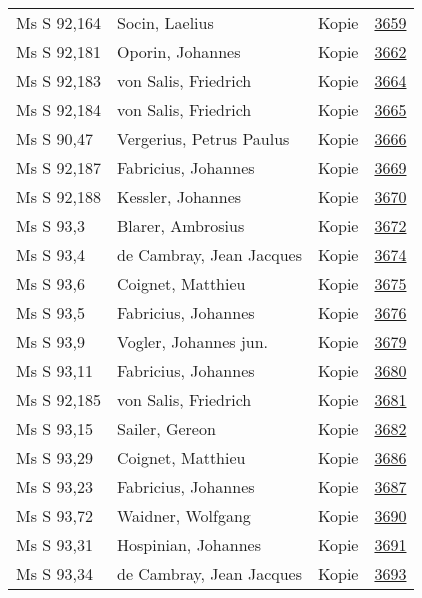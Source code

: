 \documentclass[10pt,a4paper,landscape]{report}
\begin{document}
\begin{longtable}{p{16cm}p{4cm}lr}
Ms S 92,164	&	Socin, Laelius	&	Kopie	&	\href{http://130.60.24.72/assignment/3659}{3659}\\
Ms S 92,181	&	Oporin, Johannes	&	Kopie	&	\href{http://130.60.24.72/assignment/3662}{3662}\\
Ms S 92,183	&	von Salis, Friedrich	&	Kopie	&	\href{http://130.60.24.72/assignment/3664}{3664}\\
Ms S 92,184	&	von Salis, Friedrich	&	Kopie	&	\href{http://130.60.24.72/assignment/3665}{3665}\\
Ms S 90,47	&	Vergerius, Petrus Paulus	&	Kopie	&	\href{http://130.60.24.72/assignment/3666}{3666}\\
Ms S 92,187	&	Fabricius, Johannes	&	Kopie	&	\href{http://130.60.24.72/assignment/3669}{3669}\\
Ms S 92,188	&	Kessler, Johannes	&	Kopie	&	\href{http://130.60.24.72/assignment/3670}{3670}\\
Ms S 93,3	&	Blarer, Ambrosius	&	Kopie	&	\href{http://130.60.24.72/assignment/3672}{3672}\\
Ms S 93,4	&	de Cambray, Jean Jacques	&	Kopie	&	\href{http://130.60.24.72/assignment/3674}{3674}\\
Ms S 93,6	&	Coignet, Matthieu	&	Kopie	&	\href{http://130.60.24.72/assignment/3675}{3675}\\
Ms S 93,5	&	Fabricius, Johannes	&	Kopie	&	\href{http://130.60.24.72/assignment/3676}{3676}\\
Ms S 93,9	&	Vogler, Johannes jun.	&	Kopie	&	\href{http://130.60.24.72/assignment/3679}{3679}\\
Ms S 93,11	&	Fabricius, Johannes	&	Kopie	&	\href{http://130.60.24.72/assignment/3680}{3680}\\
Ms S 92,185	&	von Salis, Friedrich	&	Kopie	&	\href{http://130.60.24.72/assignment/3681}{3681}\\
Ms S 93,15	&	Sailer, Gereon	&	Kopie	&	\href{http://130.60.24.72/assignment/3682}{3682}\\
Ms S 93,29	&	Coignet, Matthieu	&	Kopie	&	\href{http://130.60.24.72/assignment/3686}{3686}\\
Ms S 93,23	&	Fabricius, Johannes	&	Kopie	&	\href{http://130.60.24.72/assignment/3687}{3687}\\
Ms S 93,72	&	Waidner, Wolfgang	&	Kopie	&	\href{http://130.60.24.72/assignment/3690}{3690}\\
Ms S 93,31	&	Hospinian, Johannes	&	Kopie	&	\href{http://130.60.24.72/assignment/3691}{3691}\\
Ms S 93,34	&	de Cambray, Jean Jacques	&	Kopie	&	\href{http://130.60.24.72/assignment/3693}{3693}\\

\end{longtable}
\end{document}
